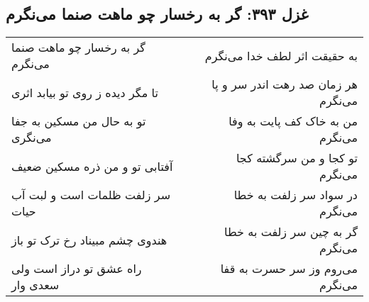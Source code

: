 \begin{center}
\section*{غزل ۳۹۳: گر به رخسار چو ماهت صنما می‌نگرم}
\label{sec:393}
\begin{longtable}{l p{0.5cm} r}
گر به رخسار چو ماهت صنما می‌نگرم
&&
به حقیقت اثر لطف خدا می‌نگرم
\\
تا مگر دیده ز روی تو بیابد اثری
&&
هر زمان صد رهت اندر سر و پا می‌نگرم
\\
تو به حال من مسکین به جفا می‌نگری
&&
من به خاک کف پایت به وفا می‌نگرم
\\
آفتابی تو و من ذره مسکین ضعیف
&&
تو کجا و من سرگشته کجا می‌نگرم
\\
سر زلفت ظلمات است و لبت آب حیات
&&
در سواد سر زلفت به خطا می‌نگرم
\\
هندوی چشم مبیناد رخ ترک تو باز
&&
گر به چین سر زلفت به خطا می‌نگرم
\\
راه عشق تو دراز است ولی سعدی وار
&&
می‌روم وز سر حسرت به قفا می‌نگرم
\\
\end{longtable}
\end{center}
